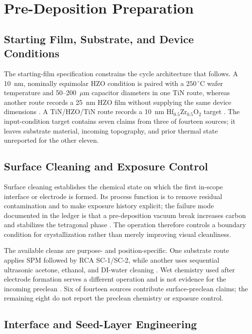 \documentclass[11pt,a4paper]{report}
\begin{document}
\section{Pre-Deposition Preparation}
\label{sec:ald-pre-deposition}
\subsection{Starting Film, Substrate, and Device Conditions}
\label{sec:ald-starting-film}

The starting-film specification constrains the cycle architecture that follows. A 10~nm, nominally equimolar HZO condition is paired with a $250\,^{\circ}$C wafer temperature and 50--200~$\mu$m capacitor diameters in one TiN route, whereas another route records a 25~nm HZO film without supplying the same device dimensions \cite{kim2020tin,zhang2015inductive}. A TiN/HZO/TiN route records a 10~nm Hf$_{0.5}$Zr$_{0.5}$O$_2$ target \cite{tsai2022stress}. The input-condition target contains seven claims from three of fourteen sources; it leaves substrate material, incoming topography, and prior thermal state unreported for the other eleven.
\subsection{Surface Cleaning and Exposure Control}
\label{sec:ald-surface-cleaning}

Surface cleaning establishes the chemical state on which the first in-scope interface or electrode is formed. Its process function is to remove residual contamination and to make exposure history explicit; the failure mode documented in the ledger is that a pre-deposition vacuum break increases carbon and stabilizes the tetragonal phase \cite{silva2023road}. The operation therefore controls a boundary condition for crystallization rather than merely improving visual cleanliness.

The available cleans are purpose- and position-specific. One substrate route applies SPM followed by RCA SC-1/SC-2, while another uses sequential ultrasonic acetone, ethanol, and DI-water cleaning \cite{choi2022chamber,song2023seed}. Wet chemistry used after electrode formation serves a different operation and is not evidence for the incoming preclean \cite{choi2025purge,kim2020tin,neuber2022peald}. Six of fourteen sources contribute surface-preclean claims; the remaining eight do not report the preclean chemistry or exposure control.
\subsection{Interface and Seed-Layer Engineering}
\label{sec:ald-interface-seed}
\end{document}
